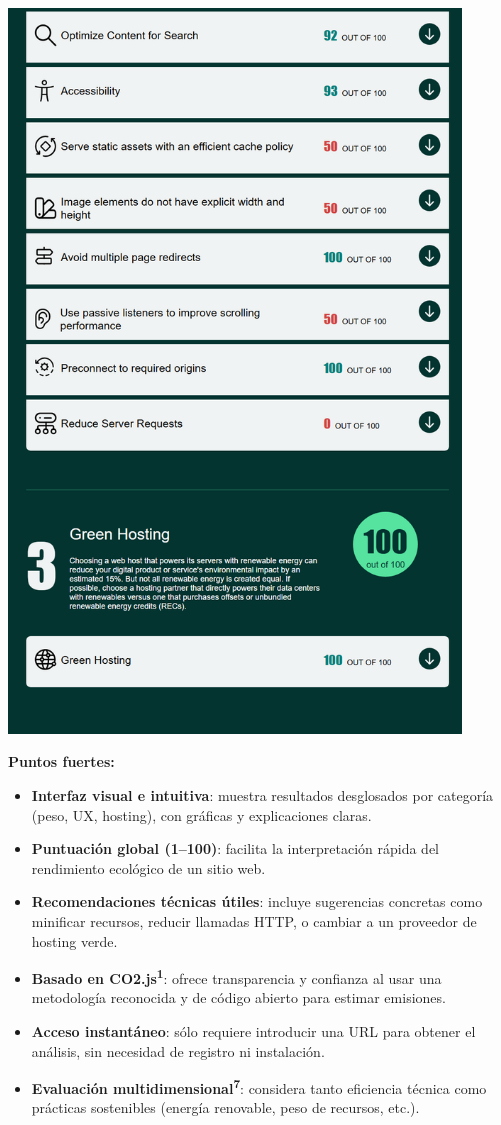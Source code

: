 \documentclass[12pt,a4paper]{report}
\begin{document}
\begin{center}
    \includegraphics[width=0.9\textwidth]{imagenes/Ecograder_5.png}
\end{center}

\textbf{Puntos fuertes:}
\begin{itemize}
    \item \textbf{Interfaz visual e intuitiva}: muestra resultados desglosados por categoría (peso, UX, hosting), con gráficas y explicaciones claras.
    \item \textbf{Puntuación global (1–100)}: facilita la interpretación rápida del rendimiento ecológico de un sitio web.
    \item \textbf{Recomendaciones técnicas útiles}: incluye sugerencias concretas como minificar recursos, reducir llamadas HTTP, o cambiar a un proveedor de hosting verde.
    \item \textbf{Basado en CO2.js\textsuperscript{1}}: ofrece transparencia y confianza al usar una metodología reconocida y de código abierto para estimar emisiones.
    \item \textbf{Acceso instantáneo}: sólo requiere introducir una URL para obtener el análisis, sin necesidad de registro ni instalación.
    \item \textbf{Evaluación multidimensional\textsuperscript{7}}: considera tanto eficiencia técnica como prácticas sostenibles (energía renovable, peso de recursos, etc.).
\end{itemize}
\end{document}
